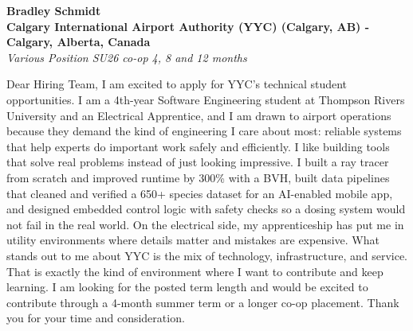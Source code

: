 \documentclass[11pt]{article}
\begin{document}
\textbf{Bradley Schmidt}\\
\vspace{0.5em}
\textbf{Calgary International Airport Authority (YYC) (Calgary, AB) - Calgary, Alberta, Canada}\\
\textit{Various Position SU26 co-op 4, 8 and 12 months}

Dear Hiring Team, I am excited to apply for YYC's technical student opportunities. I am a 4th-year Software Engineering student at Thompson Rivers University and an Electrical Apprentice, and I am drawn to airport operations because they demand the kind of engineering I care about most: reliable systems that help experts do important work safely and efficiently. I like building tools that solve real problems instead of just looking impressive. I built a ray tracer from scratch and improved runtime by 300\% with a BVH, built data pipelines that cleaned and verified a 650+ species dataset for an AI-enabled mobile app, and designed embedded control logic with safety checks so a dosing system would not fail in the real world. On the electrical side, my apprenticeship has put me in utility environments where details matter and mistakes are expensive. What stands out to me about YYC is the mix of technology, infrastructure, and service. That is exactly the kind of environment where I want to contribute and keep learning. I am looking for the posted term length and would be excited to contribute through a 4-month summer term or a longer co-op placement. Thank you for your time and consideration.
\end{document}
